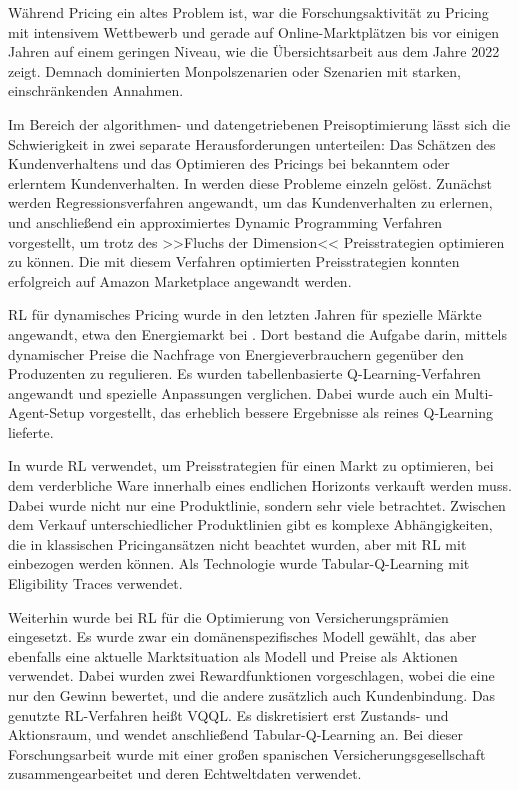 Während Pricing ein altes Problem ist, war die Forschungsaktivität zu Pricing mit intensivem Wettbewerb und gerade auf Online-Marktplätzen bis vor einigen Jahren auf einem geringen Niveau, wie die Übersichtsarbeit \cite{Gerpott2022} aus dem Jahre 2022 zeigt.
Demnach dominierten Monpolszenarien oder Szenarien mit starken, einschränkenden Annahmen.

Im Bereich der algorithmen- und datengetriebenen Preisoptimierung lässt sich die Schwierigkeit in zwei separate Herausforderungen unterteilen: Das Schätzen des Kundenverhaltens und das Optimieren des Pricings bei bekanntem oder erlerntem Kundenverhalten.
In \cite{10.1145/3219819.3219833} werden diese Probleme einzeln gelöst.
Zunächst werden Regressionsverfahren angewandt, um das Kundenverhalten zu erlernen, und anschließend ein approximiertes Dynamic Programming Verfahren vorgestellt, um trotz des >>Fluchs der Dimension<< Preisstrategien optimieren zu können.
Die mit diesem Verfahren optimierten Preisstrategien konnten erfolgreich auf Amazon Marketplace angewandt werden.

RL für dynamisches Pricing wurde in den letzten Jahren für spezielle Märkte angewandt, etwa den Energiemarkt bei \cite{Kim2016DynamicPA}.
Dort bestand die Aufgabe darin, mittels dynamischer Preise die Nachfrage von Energieverbrauchern gegenüber den Produzenten zu regulieren.
Es wurden tabellenbasierte Q-Learning-Verfahren angewandt und spezielle Anpassungen verglichen.
Dabei wurde auch ein Multi-Agent-Setup vorgestellt, das erheblich bessere Ergebnisse als reines Q-Learning lieferte.

In \cite{RANA2015426} wurde RL verwendet, um Preisstrategien für einen Markt zu optimieren, bei dem verderbliche Ware innerhalb eines endlichen Horizonts verkauft werden muss.
Dabei wurde nicht nur eine Produktlinie, sondern sehr viele betrachtet.
Zwischen dem Verkauf unterschiedlicher Produktlinien gibt es komplexe Abhängigkeiten, die in klassischen Pricingansätzen nicht beachtet wurden, aber mit RL mit einbezogen werden können.
Als Technologie wurde Tabular-Q-Learning mit Eligibility Traces verwendet.

Weiterhin wurde bei \cite{KRASHENINNIKOVA20198} RL für die Optimierung von Versicherungsprämien eingesetzt.
Es wurde zwar ein domänenspezifisches Modell gewählt, das aber ebenfalls eine aktuelle Marktsituation als Modell und Preise als Aktionen verwendet.
Dabei wurden zwei Rewardfunktionen vorgeschlagen, wobei die eine nur den Gewinn bewertet, und die andere zusätzlich auch Kundenbindung.
Das genutzte RL-Verfahren heißt VQQL.
Es diskretisiert erst Zustands- und Aktionsraum, und wendet anschließend Tabular-Q-Learning an.
Bei dieser Forschungsarbeit wurde mit einer großen spanischen Versicherungsgesellschaft zusammengearbeitet und deren Echtweltdaten verwendet.

